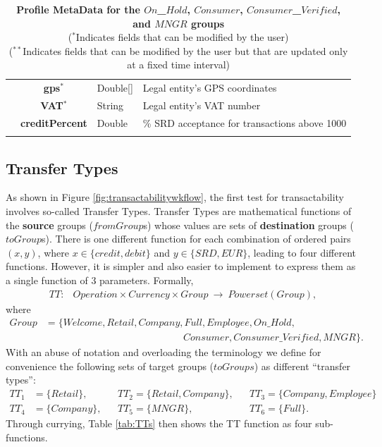 \begin{table}[H]
\begin{centering}
{\begin{tabular}{ r | c | l | l }
			& {\bf gps}$^*$				&Double[]	& Legal entity's GPS coordinates \\
			& {\bf VAT}$^*$				&String	& Legal entity's VAT number \\
			& {\bf creditPercent}			&Double	& \% SRD acceptance for transactions above 1000 \\
\Xhline{1.5pt}
\end{tabular}
}
\caption{\small\textbf{Profile MetaData for the $On$\_$Hold$, $Consumer$, $Consumer$\_$Verified$, and $MNGR$ groups}\\
($^*$Indicates fields that can be modified by the user)\\
($^{**}$Indicates fields that can be modified by the user but that are updated only at a fixed time interval)
}
\label{tab:ProfileMetaData2}
\end{centering}
\vspace{-1.5cm}
\end{table}

\subsection{Transfer Types}
As shown in Figure \ref{fig:transactabilitywkflow}, the first test for transactability involves so-called Transfer Types. Transfer Types are mathematical functions of the {\bf source} groups ($fromGroup$s) whose values are sets of {\bf destination} groups ($toGroup$s). There is one different function for each combination of ordered pairs $(x, y)$, where $x \in \{ credit, debit \}$ and $y \in \{ SRD, EUR \}$, leading to four different functions. However, it is simpler and also easier to implement to express them as a single function of 3 parameters. Formally,
\begin{align}
TT\colon &Operation \times Currency \times Group\ \rightarrow\ Powerset(Group),
\end{align}
where
\begin{align}
Group &= \{ Welcome, Retail, Company, Full, Employee, On\text{\_}Hold,  \nonumber \\
		& \qquad\qquad\qquad\qquad\qquad\qquad\qquad
			Consumer, Consumer\text{\_}Verified, MNGR \}.
\end{align}
With an abuse of notation and overloading the terminology we define for convenience the following sets of target groups ($toGroups$) as different ``transfer types'':
\begin{align*}
TT_1 &= \{ Retail \},		&& TT_2 = \{ Retail, Company \},	&& TT_3 = \{ Company, Employee \} \\
TT_4 &= \{ Company \},	&& TT_5 = \{ MNGR \},			&& TT_6 = \{ Full \}.
\end{align*}
Through currying, Table \ref{tab:TTs} then shows the TT function as four sub-functions.

